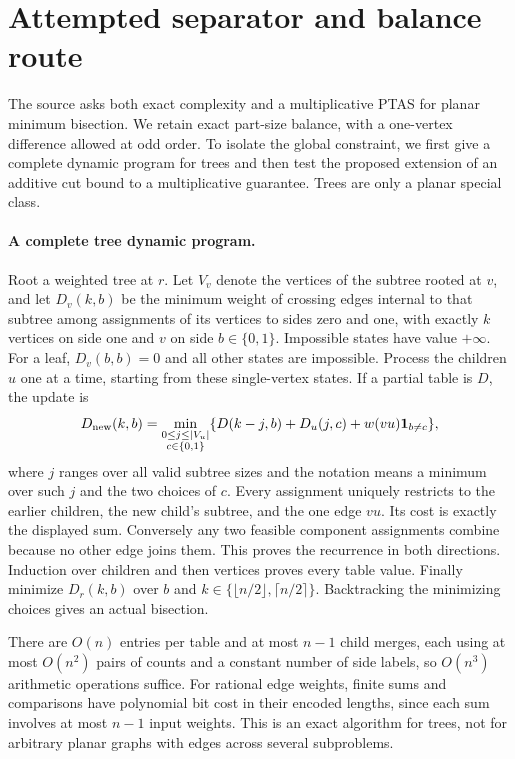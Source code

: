 \documentclass[11pt]{article}
\begin{document}
\section{Attempted separator and balance route}
The source asks both exact complexity and a multiplicative PTAS for
planar minimum bisection. We retain exact part-size balance, with a
one-vertex difference allowed at odd order. To isolate the global
constraint, we first give a complete dynamic program for trees and
then test the proposed extension of an additive cut bound to a
multiplicative guarantee. Trees are only a planar special class.

\paragraph{A complete tree dynamic program.}
Root a weighted tree at $r$. Let $V_v$ denote the vertices of the subtree rooted at $v$, and let
$D_v(k,b)$ be the minimum weight of crossing edges internal to
that subtree among assignments of its vertices to sides zero and
one, with exactly $k$ vertices on side one and $v$ on side
$b\in\{0,1\}$. Impossible states have value $+\infty$.
For a leaf, $D_v(b,b)=0$ and all other states are impossible.
Process the children $u$ one at a time, starting from these
single-vertex states. If a partial table is $D$, the update is
\[
D_{\rm new}(k,b)=\min_{\substack{0\le j\le |V_u|\\c\in\{0,1\}}}
 \{D(k-j,b)+D_u(j,c)+w(vu){\bf1}_{b\ne c}\},
\]
where $j$ ranges over all valid subtree sizes and the notation
means a minimum over such $j$ and the two choices of $c$.
Every assignment uniquely restricts to the earlier children, the
new child's subtree, and the one edge $vu$. Its cost is exactly
the displayed sum. Conversely any two feasible component assignments
combine because no other edge joins them. This proves the recurrence
in both directions. Induction over children and then vertices proves
every table value. Finally minimize $D_r(k,b)$ over $b$ and
$k\in\{\lfloor n/2\rfloor,\lceil n/2\rceil\}$.
Backtracking the minimizing choices gives an actual bisection.

There are $O(n)$ entries per table and at most $n-1$ child
merges, each using at most $O(n^2)$ pairs of counts and a
constant number of side labels, so $O(n^3)$ arithmetic operations
suffice. For rational edge weights, finite sums and comparisons have
polynomial bit cost in their encoded lengths, since each sum involves
at most $n-1$ input weights. This is an exact algorithm for trees,
not for arbitrary planar graphs with edges across several subproblems.
\end{document}
